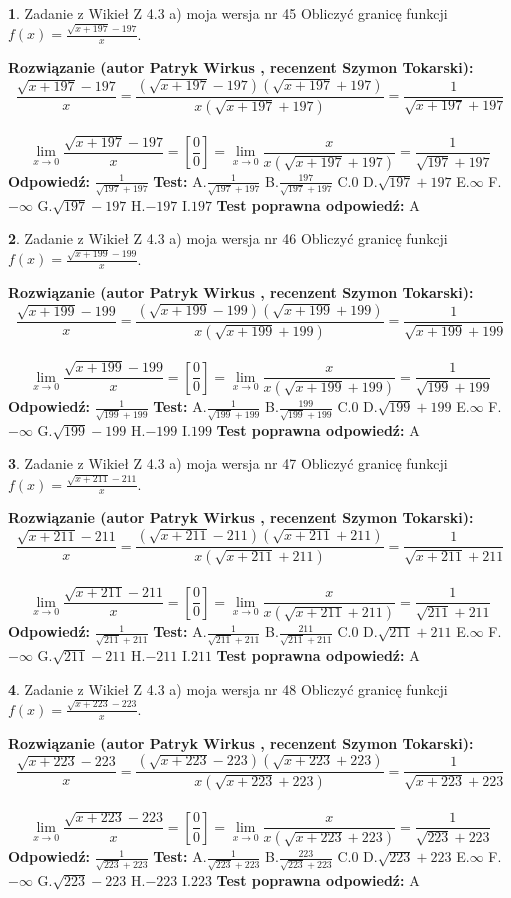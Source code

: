 \documentclass[12pt, a4paper]{article}
\theoremstyle{definition} %
\newtheorem{zad}{}
\newcommand{\zadStart}[1]{\begin{zad}#1\newline}
\newcommand{\zadStop}{\end{zad}}
\newcommand{\rozwStart}[2]{\noindent \textbf{Rozwiązanie (autor #1 , recenzent #2): }\newline}
\newcommand{\rozwStop}{\newline}
\newcommand{\odpStart}{\noindent \textbf{Odpowiedź:}\newline}
\newcommand{\odpStop}{\newline}
\newcommand{\testStart}{\noindent \textbf{Test:}\newline}
\newcommand{\testStop}{\newline}
\newcommand{\kluczStart}{\noindent \textbf{Test poprawna odpowiedź:}\newline}
\newcommand{\kluczStop}{\newline}
\begin{document}
\zadStart{Zadanie z Wikieł Z 4.3 a) moja wersja nr 45}
Obliczyć granicę funkcji $f(x)=\frac{\sqrt{x+197}-197}{x}$.
\zadStop
\rozwStart{Patryk Wirkus}{Szymon Tokarski}
$$\frac{\sqrt{x+197}-197}{x}=\frac{(\sqrt{x+197}-197)(\sqrt{x+197}+197)}{x(\sqrt{x+197}+197)}=\frac{1}{\sqrt{x+197}+197}$$
\\
$$\lim\limits_{x\to0}\frac{\sqrt{x+197}-197}{x}=[\frac{0}{0}]=
\lim\limits_{x\to0}\frac{x}{x(\sqrt{x+197}+197)} = \frac{1}{\sqrt{197}+197}$$
\rozwStop
\odpStart
$\frac{1}{\sqrt{197}+197}$
\odpStop
\testStart
A.$\frac{1}{\sqrt{197}+197}$
B.$\frac{197}{\sqrt{197}+197}$
C.$0$
D.$\sqrt{197}+197$
E.$\infty$
F.$-\infty$
G.$\sqrt{197}-197$
H.$-197$
I.$197$
\testStop
\kluczStart
A
\kluczStop



\zadStart{Zadanie z Wikieł Z 4.3 a) moja wersja nr 46}
Obliczyć granicę funkcji $f(x)=\frac{\sqrt{x+199}-199}{x}$.
\zadStop
\rozwStart{Patryk Wirkus}{Szymon Tokarski}
$$\frac{\sqrt{x+199}-199}{x}=\frac{(\sqrt{x+199}-199)(\sqrt{x+199}+199)}{x(\sqrt{x+199}+199)}=\frac{1}{\sqrt{x+199}+199}$$
\\
$$\lim\limits_{x\to0}\frac{\sqrt{x+199}-199}{x}=[\frac{0}{0}]=
\lim\limits_{x\to0}\frac{x}{x(\sqrt{x+199}+199)} = \frac{1}{\sqrt{199}+199}$$
\rozwStop
\odpStart
$\frac{1}{\sqrt{199}+199}$
\odpStop
\testStart
A.$\frac{1}{\sqrt{199}+199}$
B.$\frac{199}{\sqrt{199}+199}$
C.$0$
D.$\sqrt{199}+199$
E.$\infty$
F.$-\infty$
G.$\sqrt{199}-199$
H.$-199$
I.$199$
\testStop
\kluczStart
A
\kluczStop



\zadStart{Zadanie z Wikieł Z 4.3 a) moja wersja nr 47}
Obliczyć granicę funkcji $f(x)=\frac{\sqrt{x+211}-211}{x}$.
\zadStop
\rozwStart{Patryk Wirkus}{Szymon Tokarski}
$$\frac{\sqrt{x+211}-211}{x}=\frac{(\sqrt{x+211}-211)(\sqrt{x+211}+211)}{x(\sqrt{x+211}+211)}=\frac{1}{\sqrt{x+211}+211}$$
\\
$$\lim\limits_{x\to0}\frac{\sqrt{x+211}-211}{x}=[\frac{0}{0}]=
\lim\limits_{x\to0}\frac{x}{x(\sqrt{x+211}+211)} = \frac{1}{\sqrt{211}+211}$$
\rozwStop
\odpStart
$\frac{1}{\sqrt{211}+211}$
\odpStop
\testStart
A.$\frac{1}{\sqrt{211}+211}$
B.$\frac{211}{\sqrt{211}+211}$
C.$0$
D.$\sqrt{211}+211$
E.$\infty$
F.$-\infty$
G.$\sqrt{211}-211$
H.$-211$
I.$211$
\testStop
\kluczStart
A
\kluczStop



\zadStart{Zadanie z Wikieł Z 4.3 a) moja wersja nr 48}
Obliczyć granicę funkcji $f(x)=\frac{\sqrt{x+223}-223}{x}$.
\zadStop
\rozwStart{Patryk Wirkus}{Szymon Tokarski}
$$\frac{\sqrt{x+223}-223}{x}=\frac{(\sqrt{x+223}-223)(\sqrt{x+223}+223)}{x(\sqrt{x+223}+223)}=\frac{1}{\sqrt{x+223}+223}$$
\\
$$\lim\limits_{x\to0}\frac{\sqrt{x+223}-223}{x}=[\frac{0}{0}]=
\lim\limits_{x\to0}\frac{x}{x(\sqrt{x+223}+223)} = \frac{1}{\sqrt{223}+223}$$
\rozwStop
\odpStart
$\frac{1}{\sqrt{223}+223}$
\odpStop
\testStart
A.$\frac{1}{\sqrt{223}+223}$
B.$\frac{223}{\sqrt{223}+223}$
C.$0$
D.$\sqrt{223}+223$
E.$\infty$
F.$-\infty$
G.$\sqrt{223}-223$
H.$-223$
I.$223$
\testStop
\kluczStart
A
\kluczStop
\end{document}
